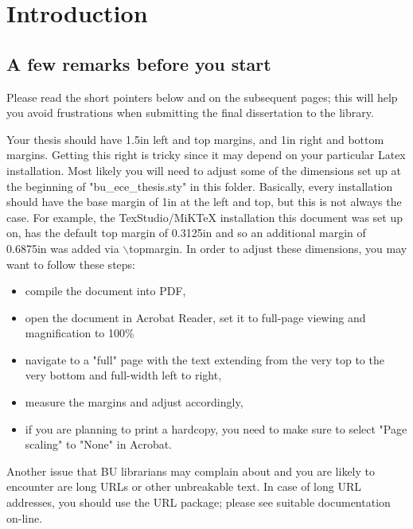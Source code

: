 \chapter{Introduction}
\label{chapter:introduction}
\thispagestyle{myheadings}

\graphicspath{{1_Chapter_Intro/Figures/}}

\section{A few remarks before you start}
\label{sec:history}

Please read the short pointers below and on the subsequent pages; this will help
you avoid frustrations when submitting the final dissertation to the library.

Your thesis should have 1.5in left and top margins, and 1in right and bottom
margins. Getting this right is tricky since it may depend on your particular
Latex installation. Most likely you will need to adjust some of the dimensions
set up at the beginning of "bu\_ece\_thesis.sty" in this folder. Basically,
every installation should have the base margin of 1in at the left and top, but
this is not always the case. For example, the TexStudio/MiKTeX installation this
document was set up on, has the default top margin of 0.3125in and so an
additional margin of 0.6875in was added via $\backslash${topmargin}. In order to
adjust these dimensions, you may want to follow these steps:

\begin{itemize}
	\item compile the document into PDF,
	\item open the document in Acrobat Reader, set it to full-page viewing and
		magnification to 100\%
	\item navigate to a "full" page with the text extending from the very
		top to the very bottom and full-width left to right,
	\item measure the margins and adjust accordingly,
	\item if you are planning to print a hardcopy, you need to make sure
		to select "Page scaling" to "None" in Acrobat.
\end{itemize}

Another issue that BU librarians may complain about and you are likely to encounter
are long URLs or other unbreakable text. In case of long URL addresses, you
should use the URL package; please see suitable documentation on-line.

